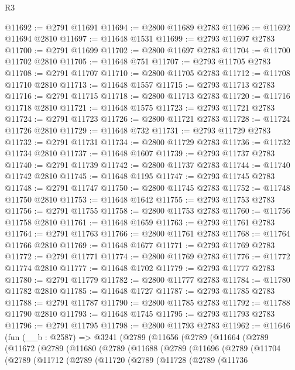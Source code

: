 \begin{lexlean}{R3}
\begin{coremodule}
@11692 := @2791 @11691
@11694 := @2800 @11689 @2783
@11696 := @11692 @11694 @2810
@11697 := @11648 @1531
@11699 := @2793 @11697 @2783
@11700 := @2791 @11699
@11702 := @2800 @11697 @2783
@11704 := @11700 @11702 @2810
@11705 := @11648 @751
@11707 := @2793 @11705 @2783
@11708 := @2791 @11707
@11710 := @2800 @11705 @2783
@11712 := @11708 @11710 @2810
@11713 := @11648 @1557
@11715 := @2793 @11713 @2783
@11716 := @2791 @11715
@11718 := @2800 @11713 @2783
@11720 := @11716 @11718 @2810
@11721 := @11648 @1575
@11723 := @2793 @11721 @2783
@11724 := @2791 @11723
@11726 := @2800 @11721 @2783
@11728 := @11724 @11726 @2810
@11729 := @11648 @732
@11731 := @2793 @11729 @2783
@11732 := @2791 @11731
@11734 := @2800 @11729 @2783
@11736 := @11732 @11734 @2810
@11737 := @11648 @1607
@11739 := @2793 @11737 @2783
@11740 := @2791 @11739
@11742 := @2800 @11737 @2783
@11744 := @11740 @11742 @2810
@11745 := @11648 @1195
@11747 := @2793 @11745 @2783
@11748 := @2791 @11747
@11750 := @2800 @11745 @2783
@11752 := @11748 @11750 @2810
@11753 := @11648 @1642
@11755 := @2793 @11753 @2783
@11756 := @2791 @11755
@11758 := @2800 @11753 @2783
@11760 := @11756 @11758 @2810
@11761 := @11648 @1659
@11763 := @2793 @11761 @2783
@11764 := @2791 @11763
@11766 := @2800 @11761 @2783
@11768 := @11764 @11766 @2810
@11769 := @11648 @1677
@11771 := @2793 @11769 @2783
@11772 := @2791 @11771
@11774 := @2800 @11769 @2783
@11776 := @11772 @11774 @2810
@11777 := @11648 @1702
@11779 := @2793 @11777 @2783
@11780 := @2791 @11779
@11782 := @2800 @11777 @2783
@11784 := @11780 @11782 @2810
@11785 := @11648 @1727
@11787 := @2793 @11785 @2783
@11788 := @2791 @11787
@11790 := @2800 @11785 @2783
@11792 := @11788 @11790 @2810
@11793 := @11648 @1745
@11795 := @2793 @11793 @2783
@11796 := @2791 @11795
@11798 := @2800 @11793 @2783
@11962 := @11646
    (fun (__b : @2587) =>
    @3241
      (@2789
        (@11656
          (@2789
            (@11664
              (@2789
                (@11672
                  (@2789
                    (@11680
                      (@2789
                        (@11688
                          (@2789
                            (@11696
                              (@2789
                                (@11704
                                  (@2789
                                    (@11712
                                      (@2789
                                        (@11720
                                          (@2789
                                            (@11728
                                              (@2789
                                                (@11736

\end{coremodule}
\end{lexlean}
